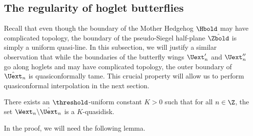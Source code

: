 \documentclass{amsart}
\begin{document}
\subsection{The regularity of hoglet butterflies}
\label{ss:regularity-of-butterflies}

Recall that even though the boundary of the Mother Hedgehog $\Hbold$ may have complicated topology, the boundary of the pseudo-Siegel half-plane $\hat{\Zbold}$ is simply a uniform quasi-line.
In this subsection, we will justify a similar observation that while the boundaries of the butterfly wings $\Uext'_n$ and $\Uext''_n$ go along hoglets and may have complicated topology, the outer boundary of $\hat{\Uext}_n$ is quasiconformally tame.
This crucial property will allow us to perform quasiconformal interpolation in the next section.

\begin{proposition}
    \label{prop:uniform-qc-bounded}
    There exists an $\threshold$-uniform constant $K>0$ such that for all $n \in \Z$, the set $\Wext_n \backslash \hat{\Uext}_n$ is a $K$-quasidisk.
\end{proposition}

In the proof, we will need the following lemma.
\end{document}

